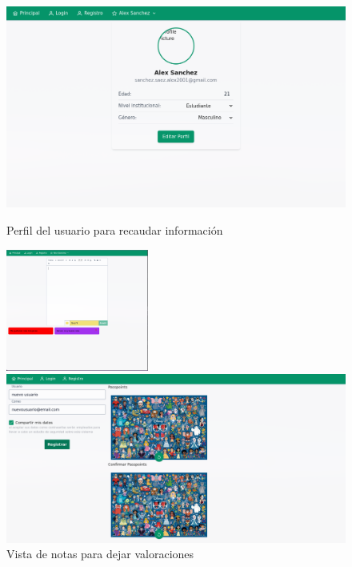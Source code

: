 \begin{anexos}
\begin{figure}
	\begin{minipage}[ht]{\linewidth}
			\centering
		\begin{minipage}[t]{0.48\linewidth}  %
			\centering
			\includegraphics[width=\linewidth]{Graphics/capturas/profile.png}
			\caption{Perfil del usuario para recaudar informaci\'on }
			\label{user-profile} 
		\end{minipage}%
		\hfill
		\begin{minipage}[t]{0.48\linewidth} %
			\centering
			\includegraphics[width=\linewidth,height=4cm]{Graphics/capturas/notes.png}
			\caption{Vista de notas para dejar valoraciones } 
			\label{notes}          
		\end{minipage}
		\end{minipage}

	\begin{minipage}[hb]{\linewidth}
		\centering
	\begin{minipage}[b]{0.6\linewidth}  %
		\centering
		\includegraphics[width=\linewidth]{Graphics/capturas/full-screen disney-password.png}
		

\end{minipage}
\end{minipage}
\end{figure}
\end{anexos}
